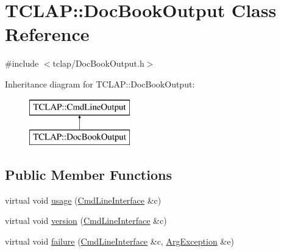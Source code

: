 \hypertarget{class_t_c_l_a_p_1_1_doc_book_output}{}\section{T\+C\+L\+A\+P\+:\+:Doc\+Book\+Output Class Reference}
\label{class_t_c_l_a_p_1_1_doc_book_output}


{\ttfamily \#include $<$tclap/\+Doc\+Book\+Output.\+h$>$}

Inheritance diagram for T\+C\+L\+A\+P\+:\+:Doc\+Book\+Output\+:\begin{figure}[H]
\begin{center}
\leavevmode
\includegraphics[height=2.000000cm]{class_t_c_l_a_p_1_1_doc_book_output}
\end{center}
\end{figure}
\subsection*{Public Member Functions}
\begin{DoxyCompactItemize}
\item 
virtual void \hyperlink{class_t_c_l_a_p_1_1_doc_book_output_adc1ec93f3f7e5e912690be01c5e7d6e2}{usage} (\hyperlink{class_t_c_l_a_p_1_1_cmd_line_interface}{Cmd\+Line\+Interface} \&c)
\item 
virtual void \hyperlink{class_t_c_l_a_p_1_1_doc_book_output_a3ccf7671dcae82aba5f0e91850ae25a4}{version} (\hyperlink{class_t_c_l_a_p_1_1_cmd_line_interface}{Cmd\+Line\+Interface} \&c)
\item 
virtual void \hyperlink{class_t_c_l_a_p_1_1_doc_book_output_a5e97f659fa1ab3b060a31e8bd7a0a40e}{failure} (\hyperlink{class_t_c_l_a_p_1_1_cmd_line_interface}{Cmd\+Line\+Interface} \&c, \hyperlink{class_t_c_l_a_p_1_1_arg_exception}{Arg\+Exception} \&e)
\end{DoxyCompactItemize}
